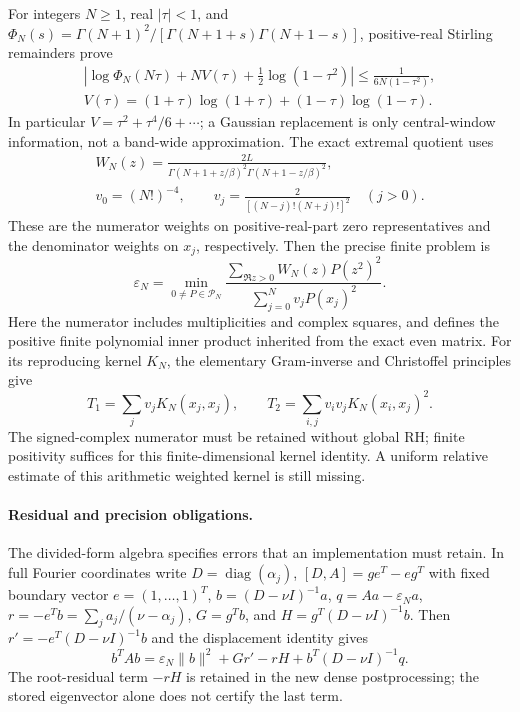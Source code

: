 For integers $N\ge1$, real $|\tau|<1$, and $\Phi_N(s)=\Gamma(N+1)^2/[\Gamma(N+1+s)\Gamma(N+1-s)]$,
positive-real Stirling remainders \cite{AttackDLMF} prove
\begin{gather*}
 \left|\log\Phi_N(N\tau)+NV(\tau)+\tfrac12\log(1-\tau^2)\right|
 \le\frac1{6N(1-\tau^2)},\\
 V(\tau)=(1+\tau)\log(1+\tau)+(1-\tau)\log(1-\tau).
\end{gather*}
In particular $V=\tau^2+\tau^4/6+\cdots$; a Gaussian replacement is only
central-window information, not a band-wide approximation.
The exact extremal quotient uses
\begin{gather*}
 W_N(z)=\frac{2L}{\Gamma(N+1+z/\beta)^2\Gamma(N+1-z/\beta)^2},\\
 v_0=(N!)^{-4},\qquad v_j=\frac{2}{[(N-j)!(N+j)!]^2}\quad(j>0).
\end{gather*}
These are the numerator weights on positive-real-part zero representatives
and the denominator weights on $x_j$, respectively. Then
the precise finite problem is
\[
 \varepsilon_N=\min_{0\ne P\in\mathcal P_N}
 \frac{\sum_{\Re z>0}W_N(z)P(z^2)^2}{\sum_{j=0}^Nv_jP(x_j)^2}.
\]
Here the numerator includes multiplicities and complex squares, and defines
the positive finite polynomial inner product inherited from the exact even
matrix. For its reproducing kernel $K_N$, the elementary Gram-inverse
and Christoffel principles \cite{AttackSimon} give
\[
 T_1=\sum_jv_jK_N(x_j,x_j),\qquad
 T_2=\sum_{i,j}v_iv_jK_N(x_i,x_j)^2.
\]
The signed-complex numerator must be retained without global RH; finite
positivity suffices for this finite-dimensional kernel identity.
A uniform relative estimate of this arithmetic weighted kernel is still missing.

\paragraph{Residual and precision obligations.}
The divided-form algebra specifies errors that an implementation must retain.
In full Fourier coordinates write $D=\operatorname{diag}(\alpha_j)$,
$[D,A]=g e^T-e g^T$ with fixed boundary vector $e=(1,\ldots,1)^T$,
$b=(D-\nu I)^{-1}a$, $q=Aa-\varepsilon_Na$,
$r=-e^Tb=\sum_j a_j/(\nu-\alpha_j)$, $G=g^Tb$, and
$H=g^T(D-\nu I)^{-1}b$. Then $r'=-e^T(D-\nu I)^{-1}b$
and the displacement identity gives
\[
 b^TAb=\varepsilon_N\|b\|^2+G r'-rH
                  +b^T(D-\nu I)^{-1}q.
\]
The root-residual term $-rH$ is retained in the new dense postprocessing;
the stored eigenvector alone does not certify the last term.

